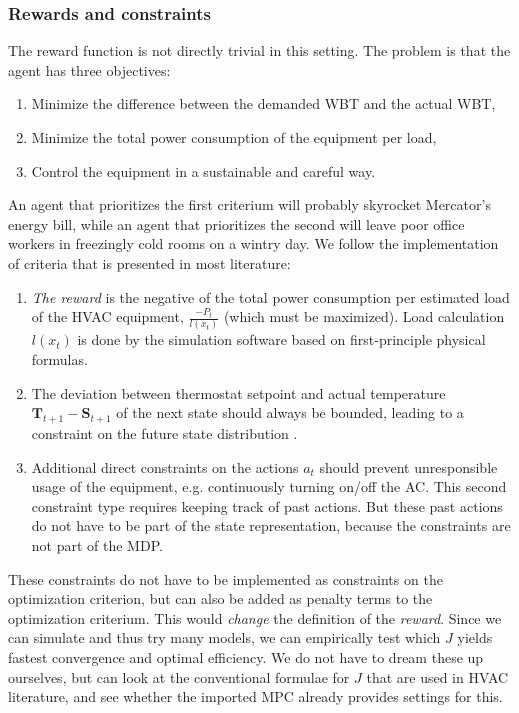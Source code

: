 \documentclass{article}
\theoremstyle{definition}
\theoremstyle{remark}
\begin{document}
\subsubsection{Rewards and constraints} \label{constraints}
The reward function is not directly trivial in this setting. The problem is that the agent has three objectives:
\begin{enumerate}
    \item Minimize the difference between the demanded WBT and the actual WBT,
    \item Minimize the total power consumption of the equipment per load,
    \item Control the equipment in a sustainable and careful way.
\end{enumerate}
An agent that prioritizes the first criterium will probably skyrocket Mercator's energy bill, while an agent that prioritizes the second will leave poor office workers in freezingly cold rooms on a wintry day. We follow the implementation of criteria that is presented in most literature: 
\begin{enumerate}
    \item \textit{The reward} is the negative of the total power consumption per estimated load of the HVAC equipment, $\frac{-P_t}{l(x_t)}$ (which must be maximized). Load calculation $l(x_t)$ is done by the simulation software based on first-principle physical formulas.
    \item  The deviation between thermostat setpoint and actual temperature $\mathbf{T}_{t+1}-\mathbf{S}_{t+1}$ of the next state should always be bounded, leading to a constraint on the future state distribution \cite{gamble_gao_2018, evans_gao_2016, luo2022controlling}. 
    \item Additional direct constraints on the actions $a_t$ should prevent unresponsible usage of the equipment, e.g. continuously turning on/off the AC. This second constraint type requires keeping track of past actions. But these past actions do not have to be part of the state representation, because the constraints are not part of the MDP. 
\end{enumerate}
    These constraints do not have to be implemented as constraints on the optimization criterion, but can also be added as penalty terms to the optimization criterium. This would \textit{change} the definition of the \textit{reward}. Since we can simulate and thus try many models, we can empirically test which $J$ yields fastest convergence and optimal efficiency. We do not have to dream these up ourselves, but can look at the conventional formulae for $J$ that are used in HVAC literature, and see whether the imported MPC already provides settings for this.
\end{document}
